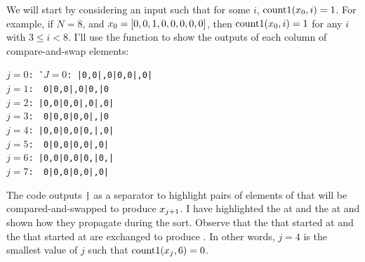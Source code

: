 \documentclass{article}
\newcommand{\ro}{{\color{MediumRed}{1}}}
\newcommand{\bz}{{\color{blue}{0}}}
\begin{document}
\begin{enumerate}
          We will start by considering an input  such that for some $i$, $\mathrm{count1}(x_{0},i) = 1$.
          For example, if $N=8$, and $x_{0} = [0,0,1,0,0,0,0,0]$, then
          $\mathrm{count1}(x_{0}, i) = 1$ for any $i$ with $3 \leq i < 8$.
          I'll use the function  to show the outputs of each column of compare-and-swap elements:
          \begin{tabbing}\tt$j=0$:  \=\kill
              $J = 0$:  \>|0,0|\ro,0|0,0|\bz,0|\\
              $j = 1$:  \>~0|0,0|\ro,0|0,\bz|0 \\
              $j = 2$:  \>|0,0|0,0|\ro,0|\bz,0|\\
              $j = 3$:  \>~0|0,0|0,0|\ro,\bz|0 \\
              $j = 4$:  \>|0,0|0,0|0,\bz|\ro,0|\\
              $j = 5$:  \>~0|0,0|0,0|\bz,0|\ro \\
              $j = 6$:  \>|0,0|0,0|0,\bz|0,\ro|\\
              $j = 7$:  \>~0|0,0|0,0|\bz,0|\ro
          \end{tabbing}
          The code outputs \texttt{|} as a separator to highlight pairs of elements of 
          that will be compared-and-swapped to produce $x_{j+1}$.
          I have highlighted the \ro{} at  and the \bz{} at  and shown how they
          propagate during the sort.  Observe that the \ro{} that started at  and the
          \bz{} that started at  are exchanged to produce .
          In other words, $j=4$ is the smallest value of $j$ such that $\mathrm{count1}(x_{j},6)= 0$.


\end{enumerate}
\end{document}
